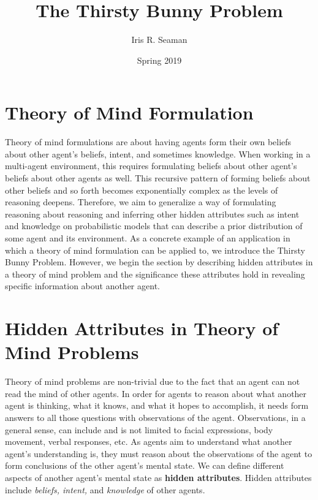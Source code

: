 \documentclass[twocolumn]{article}
\title{The Thirsty Bunny Problem}
\author{Iris R. Seaman}
\date{Spring 2019}
\begin{document}
\maketitle

\section{Theory of Mind Formulation}
Theory of mind formulations are about having agents form their own beliefs about other agent's beliefs, intent, and sometimes knowledge. When working in a multi-agent environment, this requires formulating beliefs about other agent's beliefs about other agents as well. This recursive pattern of forming beliefs about other beliefs and so forth becomes exponentially complex as the levels of reasoning deepens. Therefore, we aim to generalize a way of formulating reasoning about reasoning and inferring other hidden attributes such as intent and knowledge on probabilistic models that can describe a prior distribution of some agent and its environment. As a concrete example of an application in which a theory of mind formulation can be applied to, we introduce the Thirsty Bunny Problem. However, we begin the section by describing hidden attributes in a theory of mind problem and the significance these attributes hold in revealing specific information about another agent. 

\section{Hidden Attributes in Theory of Mind Problems}

Theory of mind problems are non-trivial due to the fact that an agent can not read the mind of other agents. In order for agents to reason about what another agent is thinking, what it knows, and what it hopes to accomplish, it needs form answers to all those questions with observations of the agent. Observations, in a general sense, can include and is not limited to facial expressions, body movement, verbal responses, etc. 
As agents aim to understand what another agent's understanding is, they must reason about the observations of the agent to form conclusions of the other agent's mental state. We can define different aspects of another agent's mental state as \textbf{hidden attributes}. Hidden attributes include \textit{beliefs, intent,} and \textit{knowledge} of other agents.  
 
\end{document}
